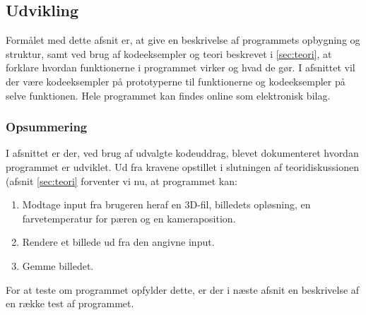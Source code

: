\subsection{Udvikling}
Formålet med dette afsnit er, at give en beskrivelse af programmets opbygning og struktur, samt ved brug af kodeeksempler og teori beskrevet i \ref{sec:teori}, at forklare hvordan funktionerne i programmet virker og hvad de gør. I afsnittet vil der være kodeeksempler på prototyperne til funktionerne og kodeeksempler på selve funktionen. Hele programmet kan findes online som elektronisk bilag.







\subsubsection*{Opsummering}
\label{sec:krav_til_kode}
I afsnittet er der, ved brug af udvalgte kodeuddrag, blevet dokumenteret hvordan programmet er udviklet. Ud fra kravene opstillet i slutningen af teoridiskussionen (afsnit \ref{sec:teori} forventer vi nu, at programmet kan:

\begin{enumerate}
    \item Modtage input fra brugeren heraf en 3D-fil, billedets opløsning, en farvetemperatur for pæren og en kameraposition.
    \item Rendere et billede ud fra den angivne input.
    \item Gemme billedet.
\end{enumerate}

For at teste om programmet opfylder dette, er der i næste afsnit en beskrivelse af en række test af programmet.